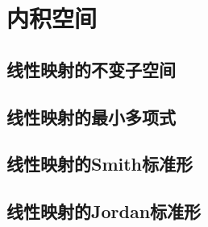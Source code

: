 \documentclass[12pt, a4paper, oneside, UTF8]{ctexbook}
\begin{document}
% 
\else
\fi
\chapter{内积空间}
	\section{线性映射的不变子空间}
	\section{线性映射的最小多项式}
	\section{线性映射的Smith标准形}
	\section{线性映射的Jordan标准形}
\ifx\allfiles\undefined
\end{document}

